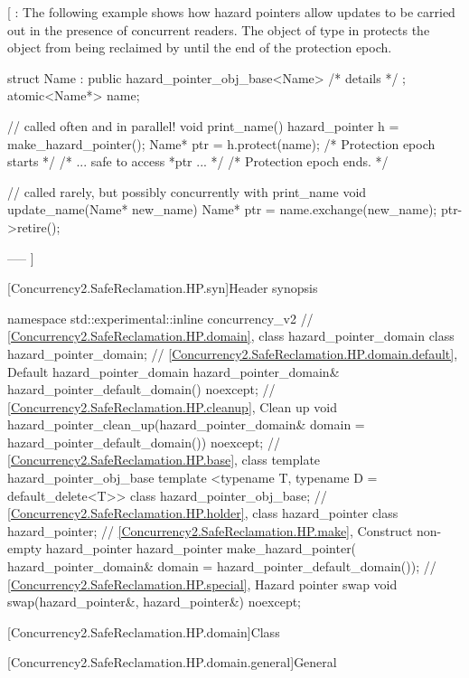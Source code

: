 [ : The following example shows how hazard pointers allow updates to be carried out in the presence of concurrent readers. The object of type  in  protects the object  from being reclaimed by  until the end of the protection epoch.

\begin{codeblock}
struct Name : public hazard_pointer_obj_base<Name> { /* details */ };
atomic<Name*> name;

// called often and in parallel!
void print_name() {
  hazard_pointer h = make_hazard_pointer();
  Name* ptr = h.protect(name); /* Protection epoch starts */
  /* ... safe to access *ptr ... */
} /* Protection epoch ends. */

// called rarely, but possibly concurrently with print_name
void update_name(Name* new_name) {
  Name* ptr = name.exchange(new_name);
  ptr->retire();
}
\end{codeblock}
--—  ]

[Concurrency2.SafeReclamation.HP.syn]{Header  synopsis}

\begin{codeblock}
namespace std::experimental::inline concurrency_v2 {
  // \ref{Concurrency2.SafeReclamation.HP.domain}, class hazard_pointer_domain
  class hazard_pointer_domain;
  // \ref{Concurrency2.SafeReclamation.HP.domain.default}, Default hazard_pointer_domain
  hazard_pointer_domain& hazard_pointer_default_domain() noexcept;
  // \ref{Concurrency2.SafeReclamation.HP.cleanup}, Clean up
  void hazard_pointer_clean_up(hazard_pointer_domain& domain = hazard_pointer_default_domain())
    noexcept;
  // \ref{Concurrency2.SafeReclamation.HP.base}, class template hazard_pointer_obj_base
  template <typename T, typename D = default_delete<T>> class hazard_pointer_obj_base;
  // \ref{Concurrency2.SafeReclamation.HP.holder}, class hazard_pointer
  class hazard_pointer;
  // \ref{Concurrency2.SafeReclamation.HP.make}, Construct non-empty hazard_pointer
  hazard_pointer make_hazard_pointer(
    hazard_pointer_domain& domain = hazard_pointer_default_domain());
  // \ref{Concurrency2.SafeReclamation.HP.special}, Hazard pointer swap
  void swap(hazard_pointer&, hazard_pointer&) noexcept;
}
\end{codeblock}

[Concurrency2.SafeReclamation.HP.domain]{Class }

[Concurrency2.SafeReclamation.HP.domain.general]{General}

